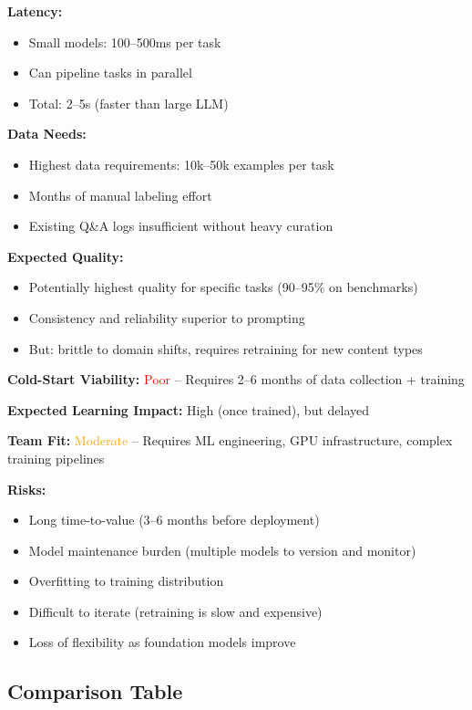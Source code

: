 \documentclass[11pt,letterpaper]{article}
\begin{document}
\textbf{Latency:}
\begin{itemize}
\item Small models: 100--500ms per task
\item Can pipeline tasks in parallel
\item Total: 2--5s (faster than large LLM)
\end{itemize}

\textbf{Data Needs:}
\begin{itemize}
\item Highest data requirements: 10k--50k examples per task
\item Months of manual labeling effort
\item Existing Q\&A logs insufficient without heavy curation
\end{itemize}

\textbf{Expected Quality:}
\begin{itemize}
\item Potentially highest quality for specific tasks (90--95\% on benchmarks)
\item Consistency and reliability superior to prompting
\item But: brittle to domain shifts, requires retraining for new content types
\end{itemize}

\textbf{Cold-Start Viability:} \textcolor{red}{Poor} -- Requires 2--6 months of data collection + training

\textbf{Expected Learning Impact:} High (once trained), but delayed

\textbf{Team Fit:} \textcolor{orange}{Moderate} -- Requires ML engineering, GPU infrastructure, complex training pipelines

\textbf{Risks:}
\begin{itemize}
\item Long time-to-value (3--6 months before deployment)
\item Model maintenance burden (multiple models to version and monitor)
\item Overfitting to training distribution
\item Difficult to iterate (retraining is slow and expensive)
\item Loss of flexibility as foundation models improve
\end{itemize}

\subsection{Comparison Table}\label{subsec:comparison-table}
\end{document}
